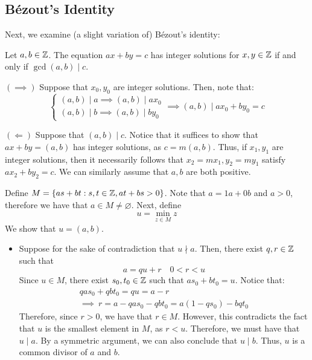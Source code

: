 \documentclass{article}
\begin{document}
\subsection{B\'ezout's Identity}

Next, we examine (a slight variation of) B\'ezout's identity:

\begin{thm}
    Let $ a, b \in \mathbb{Z} $. The equation $ ax + by = c $ has integer solutions
    for $ x, y \in \mathbb{Z} $ if and only if $ \gcd(a, b) \mid c $.
\end{thm}

\begin{pf}[source=Primary Source Material]
    $ (\implies) $ Suppose that $ x_{0}, y_{0} $ are integer solutions.
    Then, note that:
    \begin{equation*}
        \begin{cases} (a, b) \mid a \implies (a, b) \mid ax_{0} \\ (a, b) \mid b \implies (a, b) \mid by_{0} \end{cases} \implies (a, b) \mid ax_{0} + by_{0} = c
    \end{equation*}

    $ (\Longleftarrow) $ Suppose that $ (a, b) \mid c $. Notice that it suffices to show that
    $  ax + by = (a, b) $ has integer solutions, as $ c = m(a, b) $. Thus, if $ x_{1}, y_{1} $ are
    integer solutions, then it necessarily follows that $ x_{2} = mx_{1}, y_{2} = my_{1} $ satisfy $ ax_{2} + by_{2} = c $. We can similarly assume that $ a, b $ are both positive. \npgh

    Define $ M = \left\{{as + bt : s, t \in \mathbb{Z}, at + bs > 0}\right\} $. Note that $ a = 1a + 0b $ and $ a > 0 $, therefore we have that $ a \in M \neq \varnothing $. Next, define
    \begin{equation*}
        u = \min_{z \in M} z
    \end{equation*}
    We show that $ u = (a, b) $.
    \begin{itemize}
        \item Suppose for the sake of contradiction that $ u \nmid a $.
            Then, there exist $ q, r \in \mathbb{Z} $ such that
            \begin{equation*}
                a = qu + r \quad 0 < r < u
            \end{equation*}
            Since $ u \in M $, there exist $ s_{0}, t_{0} \in \mathbb{Z} $ such that
            $ as_{0} + bt_{0} = u $. Notice that:
            \begin{gather*}
                qas_{0} + qbt_{0} = qu = a - r \\
                \implies \ r = a - qas_{0} - qbt_{0} = a(1-qs_{0}) - bqt_{0}
            \end{gather*}
            Therefore, since $ r > 0 $, we have that $ r \in M $. However, this contradicts the fact that $ u $ is the smallest element in $ M $, as $ r < u $. Therefore, we must have that $ u \mid a $. By a symmetric argument, we can also conclude that $ u \mid b $. Thus, $ u $ is a common divisor of $ a $ and $ b $.


\end{itemize}
\end{pf}
\end{document}
